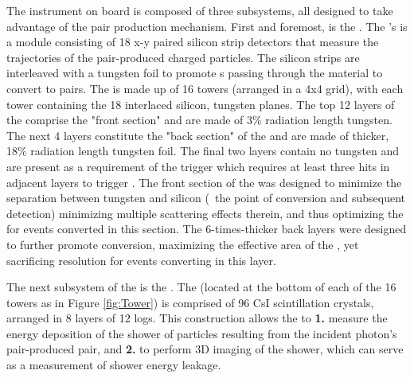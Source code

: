 The \lat{} instrument on board \Fermi{} is composed of three subsystems, all designed to take advantage of the pair production mechanism. First and foremost, is the \tkr{}. The \lat{}'s \tkr{} is a module consisting of 18 x-y paired silicon strip detectors that measure the trajectories of the pair-produced charged particles. The silicon strips are interleaved with a tungsten foil to promote \gam{}s passing through the material to convert to \ee{} pairs. The \lat{} is made up of 16 towers (arranged in a 4x4 grid), with each tower containing the 18 interlaced silicon, tungsten planes. The top 12 layers of the \tkr{} comprise the "front section" and are made of 3\% radiation length tungsten. The next 4 layers constitute the "back section" of the \tkr{} and are made of thicker, 18\% radiation length tungsten foil. The final two \tkr{} layers contain no tungsten and are present as a requirement of the \tkr{} trigger which requires at least three hits in adjacent layers to trigger \cite{lat_perf}. The front section of the \tkr{} was designed to minimize the separation between tungsten and silicon (\ie{}\ the point of conversion and subsequent detection) minimizing multiple scattering effects therein, and thus optimizing the \psf{} for events converted in this section. The 6-times-thicker back layers were designed to further promote conversion, maximizing the effective area of the \lat{}, yet sacrificing resolution for events converting in this layer.

The next subsystem of the \lat{} is the \calo{}. The \calo{} (located at the bottom of each of the 16 towers as in Figure \ref{fig:Tower}) is comprised of 96 CsI scintillation crystals, arranged in 8 layers of 12 logs. This construction allows the \calo{} to {\bf 1.} measure the energy deposition of the shower of particles resulting from the incident photon's pair-produced \ee{} pair, and {\bf 2.} to perform 3D imaging of the shower, which can serve as a measurement of shower energy leakage.


